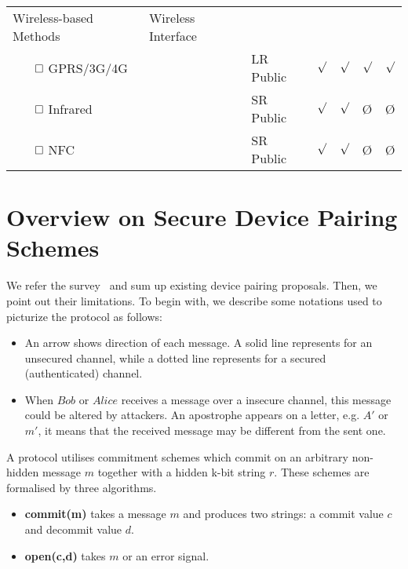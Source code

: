 \begin{table}[ht]
{\begin{tabular}{ p{3.5cm} p{3cm} l | l l l l }
Wireless-based Methods & Wireless Interface & & & & &  \\ 
$\qed$ GPRS/3G/4G & & LR Public & $\surd$ &$\surd$ & $\surd$ & $\surd$  \\
$\qed$ Infrared & & SR Public & $\surd$ & $\surd$ & \O & \O \\ 
$\qed$ NFC & & SR Public & $\surd$ & $\surd$ & \O& \O \\ \hline
\end{tabular}
}
\end{table}

\section{Overview on Secure Device Pairing Schemes}

We refer the survey~\cite{6687314} and sum up existing device pairing proposals. Then, we point out their limitations. To begin with, we describe some notations used to picturize the protocol as follows:

\begin{itemize}
\item An arrow shows direction of each message. A solid line represents for an unsecured channel, while a dotted line represents for a secured (authenticated) channel. 
\item When $Bob$ or $Alice$ receives a message over a insecure channel, this message could be altered by attackers. An apostrophe appears on a letter, e.g. $A'$ or $m'$, it means that the received message may be different from the sent one. 
\end{itemize}

A protocol utilises commitment schemes which commit on an arbitrary non-hidden message $m$ together with a hidden k-bit string $r$. These schemes are formalised by three algorithms.

\begin{itemize}
\item \textbf{commit(m)} takes a message $m$ and produces two strings: a commit value $c$ and decommit value $d$. 
\item \textbf{open(c,d)} takes $m$ or  an error signal. 
\end{itemize} 


